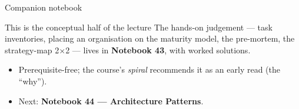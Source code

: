 \documentclass[aspectratio=169,11pt]{beamer}
\begin{document}
\begin{frame}{Companion notebook}
  \begin{exampleblock}{This is the conceptual half of the lecture}
    The hands-on judgement --- task inventories, placing an organisation on the maturity model, the pre-mortem, the strategy-map 2$\times$2 --- lives in \textbf{Notebook 43}, with worked solutions.
  \end{exampleblock}
  \begin{itemize}
    \item Prerequisite-free; the course's \emph{spiral} recommends it as an early read (the ``why'').
    \item Next: \textbf{Notebook 44 --- Architecture Patterns}.
  \end{itemize}
\end{frame}
\end{document}
